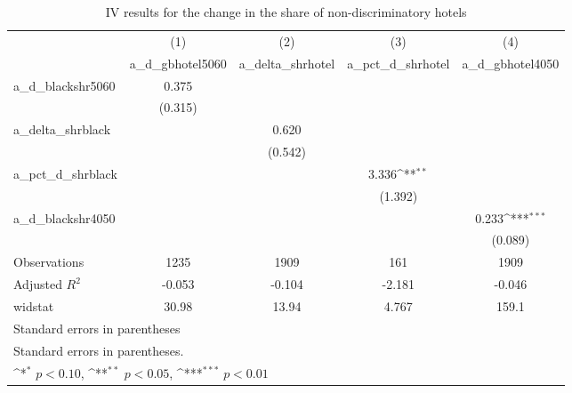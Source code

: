 \begin{table}[htbp]\centering
\def\sym#1{\ifmmode^{#1}\else\(^{#1}\)\fi}
\caption{IV results for the change in the share of non-discriminatory hotels}
\begin{tabular}{l*{4}{c}}
\hline\hline
                    &\multicolumn{1}{c}{(1)}&\multicolumn{1}{c}{(2)}&\multicolumn{1}{c}{(3)}&\multicolumn{1}{c}{(4)}\\
                    &\multicolumn{1}{c}{a\_d\_gbhotel5060}&\multicolumn{1}{c}{a\_delta\_shrhotel}&\multicolumn{1}{c}{a\_pct\_d\_shrhotel}&\multicolumn{1}{c}{a\_d\_gbhotel4050}\\
\hline
a\_d\_blackshr5060    &       0.375         &                     &                     &                     \\
                    &     (0.315)         &                     &                     &                     \\
[1em]
a\_delta\_shrblack    &                     &       0.620         &                     &                     \\
                    &                     &     (0.542)         &                     &                     \\
[1em]
a\_pct\_d\_shrblack    &                     &                     &       3.336\sym{**} &                     \\
                    &                     &                     &     (1.392)         &                     \\
[1em]
a\_d\_blackshr4050    &                     &                     &                     &       0.233\sym{***}\\
                    &                     &                     &                     &     (0.089)         \\
\hline
Observations        &        1235         &        1909         &         161         &        1909         \\
Adjusted \(R^{2}\)  &      -0.053         &      -0.104         &      -2.181         &      -0.046         \\
widstat             &       30.98         &       13.94         &       4.767         &       159.1         \\
\hline\hline
\multicolumn{5}{l}{\footnotesize Standard errors in parentheses}\\
\multicolumn{5}{l}{\footnotesize Standard errors in parentheses.}\\
\multicolumn{5}{l}{\footnotesize \sym{*} \(p<0.10\), \sym{**} \(p<0.05\), \sym{***} \(p<0.01\)}\\
\end{tabular}
\end{table}

